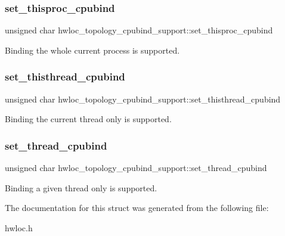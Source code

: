 \subsubsection{\texorpdfstring{set\+\_\+thisproc\+\_\+cpubind}{set\_thisproc\_cpubind}}
{\footnotesize\ttfamily unsigned char hwloc\+\_\+topology\+\_\+cpubind\+\_\+support\+::set\+\_\+thisproc\+\_\+cpubind}

Binding the whole current process is supported. \mbox{\label{a00294_a57a89a4b5f1f74fa6cfe176f1e8b0798}} 
\subsubsection{\texorpdfstring{set\+\_\+thisthread\+\_\+cpubind}{set\_thisthread\_cpubind}}
{\footnotesize\ttfamily unsigned char hwloc\+\_\+topology\+\_\+cpubind\+\_\+support\+::set\+\_\+thisthread\+\_\+cpubind}

Binding the current thread only is supported. \mbox{\label{a00294_a46fba33e307909ce256624687799dd6d}} 
\subsubsection{\texorpdfstring{set\+\_\+thread\+\_\+cpubind}{set\_thread\_cpubind}}
{\footnotesize\ttfamily unsigned char hwloc\+\_\+topology\+\_\+cpubind\+\_\+support\+::set\+\_\+thread\+\_\+cpubind}

Binding a given thread only is supported. 

The documentation for this struct was generated from the following file\+:\begin{DoxyCompactItemize}
\item 
hwloc.\+h\end{DoxyCompactItemize}
